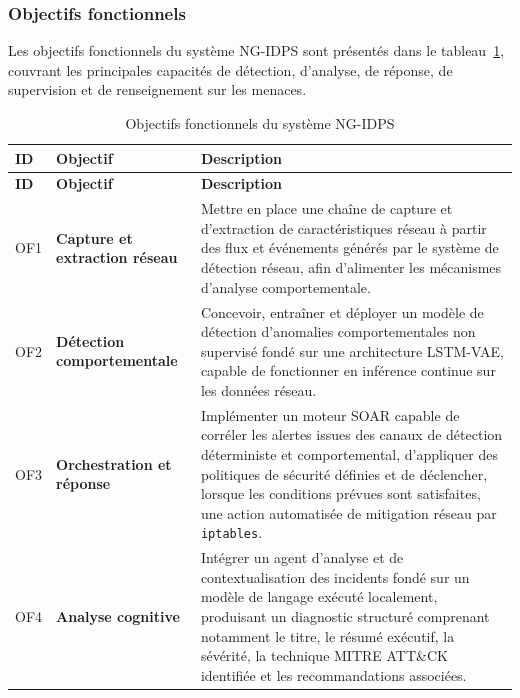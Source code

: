 \subsubsection*{Objectifs fonctionnels}

Les objectifs fonctionnels du système NG-IDPS sont présentés dans le tableau~\ref{tab:objectifs_fonctionnels}, couvrant les principales capacités de détection, d'analyse, de réponse, de supervision et de renseignement sur les menaces.

\renewcommand{\arraystretch}{1.5}

\begin{longtable}{|p{}|p{}|p{}|}

\caption{Objectifs fonctionnels du système NG-IDPS}
\label{tab:objectifs_fonctionnels} \\

\hline
\rowcolor[HTML]{EFEFEF}
\textbf{ID} & \textbf{Objectif} & \textbf{Description} \\ \hline
\endfirsthead

\hline
\rowcolor[HTML]{EFEFEF}
\textbf{ID} & \textbf{Objectif} & \textbf{Description} \\ \hline
\endhead

OF1 &
\textbf{Capture et extraction réseau} &
Mettre en place une chaîne de capture et d'extraction de caractéristiques réseau à partir des flux et événements générés par le système de détection réseau, afin d'alimenter les mécanismes d'analyse comportementale. \\ \hline

OF2 &
\textbf{Détection comportementale} &
Concevoir, entraîner et déployer un modèle de détection d'anomalies comportementales non supervisé fondé sur une architecture LSTM-VAE, capable de fonctionner en inférence continue sur les données réseau. \\ \hline

OF3 &
\textbf{Orchestration et réponse} &
Implémenter un moteur SOAR capable de corréler les alertes issues des canaux de détection déterministe et comportemental, d'appliquer des politiques de sécurité définies et de déclencher, lorsque les conditions prévues sont satisfaites, une action automatisée de mitigation réseau par \texttt{iptables}. \\ \hline

OF4 &
\textbf{Analyse cognitive} &
Intégrer un agent d'analyse et de contextualisation des incidents fondé sur un modèle de langage exécuté localement, produisant un diagnostic structuré comprenant notamment le titre, le résumé exécutif, la sévérité, la technique MITRE ATT\&CK identifiée et les recommandations associées. \\ \hline


\end{longtable}
